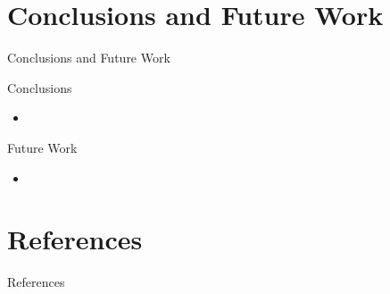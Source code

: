 \documentclass{beamer}
\begin{document}

\section{Conclusions and Future Work}

\begin{frame}{Conclusions and Future Work}
  \begin{block}{Conclusions}
    \begin{itemize}
      \item 
    \end{itemize}
  \end{block}
  \begin{block}{Future Work}
    \begin{itemize}
      \item 
    \end{itemize}
  \end{block}
\end{frame}


\section{References}

\begin{frame}{References}
  
  
\end{frame}

\end{document}
